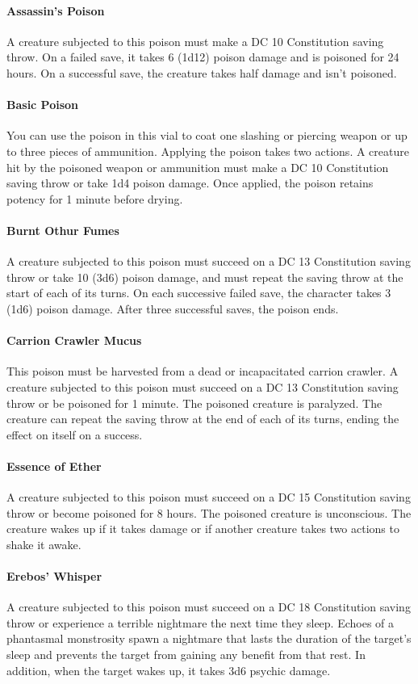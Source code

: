     \paragraph{Assassin's Poison}
        A creature subjected to this poison must make a DC 10 Constitution saving throw.
        On a failed save, it takes 6 (1d12) poison damage and is poisoned for 24 hours.
        On a successful save, the creature takes half damage and isn't poisoned.
    \paragraph{Basic Poison}
        You can use the poison in this vial to coat one slashing or piercing weapon or up to three pieces of ammunition.
        Applying the poison takes two actions.
        A creature hit by the poisoned weapon or ammunition must make a DC 10 Constitution saving throw or take 1d4 poison damage.
        Once applied, the poison retains potency for 1 minute before drying.
    \paragraph{Burnt Othur Fumes}
        A creature subjected to this poison must succeed on a DC 13 Constitution saving throw or take 10 (3d6) poison damage, and must repeat the saving throw at the start of each of its turns.
        On each successive failed save, the character takes 3 (1d6) poison damage.
        After three successful saves, the poison ends.
    \paragraph{Carrion Crawler Mucus}
        This poison must be harvested from a dead or incapacitated carrion crawler.
        A creature subjected to this poison must succeed on a DC 13 Constitution saving throw or be poisoned for 1 minute.
        The poisoned creature is paralyzed.
        The creature can repeat the saving throw at the end of each of its turns, ending the effect on itself on a success.
    \paragraph{Essence of Ether}
        A creature subjected to this poison must succeed on a DC 15 Constitution saving throw or become poisoned for 8 hours.
        The poisoned creature is unconscious.
        The creature wakes up if it takes damage or if another creature takes two actions to shake it awake.
    \paragraph{Erebos' Whisper}
        A creature subjected to this poison must succeed on a DC 18 Constitution saving throw or experience a terrible nightmare the next time they sleep.
        Echoes of a phantasmal monstrosity spawn a nightmare that lasts the duration of the target's sleep and prevents the target from gaining any benefit from that rest.
        In addition, when the target wakes up, it takes 3d6 psychic damage.
